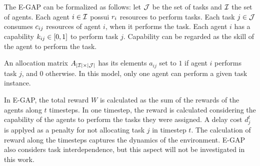 \documentclass[conference]{IEEEtran}
\begin{document}
The E-GAP can be formalized as follows: let $\mathcal{J}$ be the set of tasks and $\mathcal{I}$ the set of agents. Each agent $i \in \mathcal{I}$ possui $r_{i}$ resources to perform tasks. Each task $j \in \mathcal{J}$ consumes $c_{ij}$ resources of agent $i$, when it performs the task. Each agent $i$ has a capability $k_{ij} \in [0,1]$ to perform task $j$. Capability can be regarded as the skill of the agent to perform the task. %

An allocation matrix $A_{|\mathcal{I}| \times |\mathcal{J}|}$ has its elements $a_{ij}$ set to $1$ if agent $i$ performs task $j$, and 0 otherwise. In this model, only one agent can perform a given task instance. %


% 
In E-GAP, the total reward $W$ is calculated as the sum of the rewards of the agents along $t$ timesteps. In one timestep, the reward is calculated considering the capability of the agents to perform the tasks they were assigned. A delay cost $d_j^t$ is applyed as a penalty for not allocating task $j$ in timestep $t$. The calculation of reward along the timesteps captures the dynamics of the environment. E-GAP also considers task interdependence, but this aspect will not be investigated in this work. 
\end{document}

